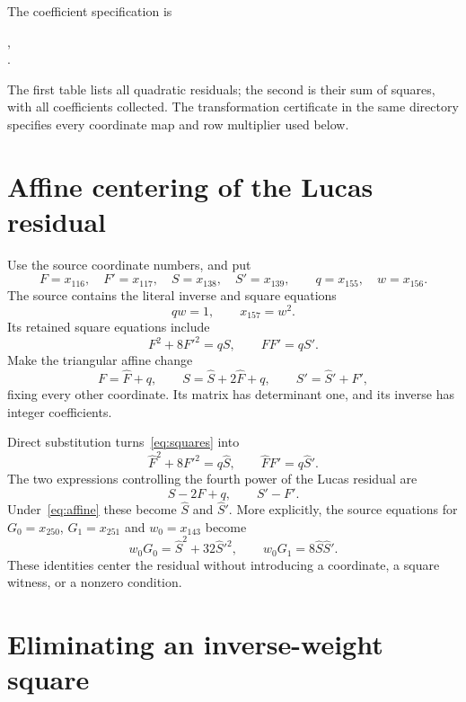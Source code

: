 \documentclass[11pt,a4paper]{article}
\begin{document}
The coefficient specification is
\begin{center}\small
{},\\
.
\end{center}
The first table lists all quadratic residuals; the second is their
sum of squares, with all coefficients collected. The transformation
certificate in the same directory specifies every coordinate map
and row multiplier used below.

\section{Affine centering of the Lucas residual}

Use the source coordinate numbers, and put
\[
 F=x_{116},\quad F'=x_{117},\quad S=x_{138},\quad S'=x_{139},
 \qquad q=x_{155},\quad w=x_{156}.
\]
The source contains the literal inverse and square equations
\begin{equation}\label{eq:guards}
 qw=1,\qquad x_{157}=w^2.
\end{equation}
Its retained square equations include
\begin{equation}\label{eq:squares}
 F^2+8F'^2=qS,\qquad FF'=qS'.
\end{equation}
Make the triangular affine change
\begin{equation}\label{eq:affine}
 F=\widehat F+q,\qquad
 S=\widehat S+2\widehat F+q,\qquad
 S'=\widehat S'+F',
\end{equation}
fixing every other coordinate. Its matrix has determinant one, and
its inverse has integer coefficients.

Direct substitution turns~\eqref{eq:squares} into
\[
 \widehat F^2+8F'^2=q\widehat S,
 \qquad \widehat F F'=q\widehat S'.
\]
The two expressions controlling the fourth power of the Lucas
residual are
\[
                 S-2F+q,\qquad S'-F'.
\]
Under~\eqref{eq:affine} these become $\widehat S$ and
$\widehat S'$. More explicitly, the source equations for
$G_0=x_{250}$, $G_1=x_{251}$ and $w_0=x_{143}$ become
\[
 w_0G_0=\widehat S^2+32\widehat S'^2,
 \qquad w_0G_1=8\widehat S\widehat S'.
\]
These identities center the residual without introducing a coordinate,
a square witness, or a nonzero condition.

\section{Eliminating an inverse-weight square}
\end{document}
